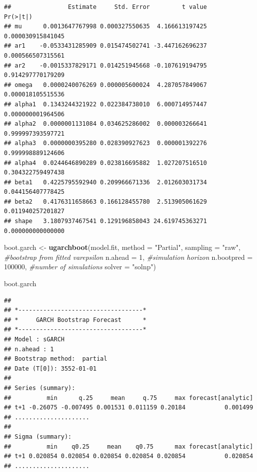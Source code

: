 \documentclass[
]{book}
\newenvironment{Shaded}{\begin{snugshade}}{\end{snugshade}}
\newcommand{\AttributeTok}[1]{\textcolor[rgb]{0.13,0.29,0.53}{#1}}
\newcommand{\CommentTok}[1]{\textcolor[rgb]{0.56,0.35,0.01}{\textit{#1}}}
\newcommand{\DecValTok}[1]{\textcolor[rgb]{0.00,0.00,0.81}{#1}}
\newcommand{\FunctionTok}[1]{\textcolor[rgb]{0.13,0.29,0.53}{\textbf{#1}}}
\newcommand{\NormalTok}[1]{#1}
\newcommand{\OtherTok}[1]{\textcolor[rgb]{0.56,0.35,0.01}{#1}}
\newcommand{\StringTok}[1]{\textcolor[rgb]{0.31,0.60,0.02}{#1}}
\begin{document}
\begin{verbatim}
##                Estimate     Std. Error         t value          Pr(>|t|)
## mu      0.0013647767998 0.000327550635  4.166613197425 0.000030915841045
## ar1    -0.0533431285909 0.015474502741 -3.447162696237 0.000566507315561
## ar2    -0.0015337829171 0.014251945668 -0.107619194795 0.914297770179209
## omega   0.0000240076269 0.000005600024  4.287057849067 0.000018105515536
## alpha1  0.1343244321922 0.022384738010  6.000714957447 0.000000001964506
## alpha2  0.0000001131084 0.034625286002  0.000003266641 0.999997393597721
## alpha3  0.0000000395280 0.028390927623  0.000001392276 0.999998889124606
## alpha4  0.0244646890289 0.023816695882  1.027207516510 0.304322759497438
## beta1   0.4225795592940 0.209966671336  2.012603031734 0.044156407778425
## beta2   0.4176311658663 0.166128455780  2.513905061629 0.011940257201827
## shape   3.1807937467541 0.129196858043 24.619745363271 0.000000000000000
\end{verbatim}

\begin{Shaded}
\begin{Highlighting}[]
\NormalTok{boot.garch }\OtherTok{\textless{}{-}} \FunctionTok{ugarchboot}\NormalTok{(model.fit,}
                         \AttributeTok{method =} \StringTok{"Partial"}\NormalTok{,}
                         \AttributeTok{sampling =} \StringTok{"raw"}\NormalTok{,  }\CommentTok{\#bootstrap from fitted varepsilon}
                         \AttributeTok{n.ahead =} \DecValTok{1}\NormalTok{,          }\CommentTok{\#simulation horizon}
                         \AttributeTok{n.bootpred =} \DecValTok{100000}\NormalTok{, }\CommentTok{\#number of simulations }
                         \AttributeTok{solver =} \StringTok{"solnp"}\NormalTok{)}

\NormalTok{boot.garch}
\end{Highlighting}
\end{Shaded}

\begin{verbatim}
## 
## *-----------------------------------*
## *     GARCH Bootstrap Forecast      *
## *-----------------------------------*
## Model : sGARCH
## n.ahead : 1
## Bootstrap method:  partial
## Date (T[0]): 3552-01-01
## 
## Series (summary):
##          min      q.25     mean     q.75     max forecast[analytic]
## t+1 -0.26075 -0.007495 0.001531 0.011159 0.20184           0.001499
## .....................
## 
## Sigma (summary):
##          min    q0.25     mean    q0.75      max forecast[analytic]
## t+1 0.020854 0.020854 0.020854 0.020854 0.020854           0.020854
## .....................
\end{verbatim}
\end{document}
